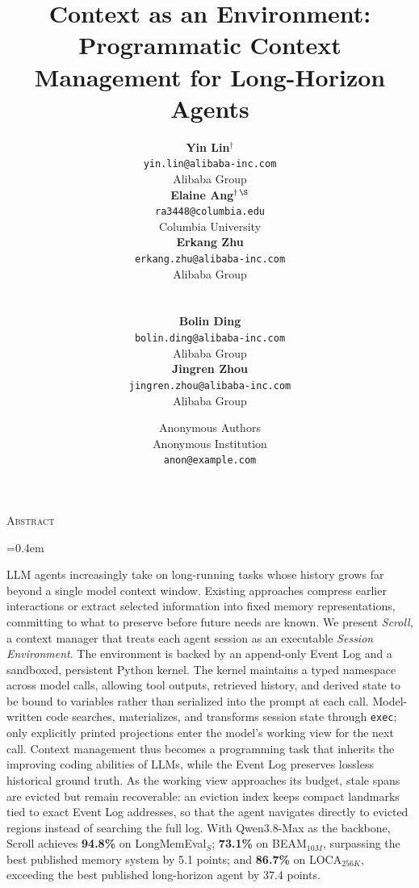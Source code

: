 \documentclass[11pt]{article}
\title{
    Context as an Environment:\\
    Programmatic Context Management for Long-Horizon Agents
}
\author{%
      \begin{tabular}[t]{c}
        \textbf{Yin Lin}$^{\dagger}$\\
        {\footnotesize\texttt{yin.lin@alibaba-inc.com}}\\
        {\small Alibaba Group}
      \end{tabular}\hspace{1.2em}
      \begin{tabular}[t]{c}
        \textbf{Elaine Ang}$^{\dagger\,\S}$\\
        {\footnotesize\texttt{ra3448@columbia.edu}}\\
        {\small Columbia University}
      \end{tabular}\hspace{1.2em}
      \begin{tabular}[t]{c}
        \textbf{Erkang Zhu}\\
        {\footnotesize\texttt{erkang.zhu@alibaba-inc.com}}\\
        {\small Alibaba Group}
      \end{tabular}\\[1.2em]
      \begin{tabular}[t]{c}
        \textbf{Bolin Ding}\\
        {\footnotesize\texttt{bolin.ding@alibaba-inc.com}}\\
        {\small Alibaba Group}
      \end{tabular}\hspace{3em}
      \begin{tabular}[t]{c}
        \textbf{Jingren Zhou}\\
        {\footnotesize\texttt{jingren.zhou@alibaba-inc.com}}\\
        {\small Alibaba Group}
      \end{tabular}%
    }
\date{}
\author{Anonymous Authors \\
    Anonymous Institution \\
    \texttt{anon@example.com}}
\makeatletter
\renewcommand{\maketitle}{%
      \thispagestyle{fancy}%
      \begin{center}
        \vspace*{0.3em}
        {\LARGE\bfseries \@title\par}
        \vspace{1.2em}
        \@author\par
      \end{center}
      \vspace{0.8em}
    }
\renewenvironment{abstract}{%
      \begin{center}{\large\scshape Abstract}\end{center}%
      \vspace{-0.3em}%
      \begin{list}{}{\leftmargin=0.4in \rightmargin=0.4in
                     \listparindent=0pt \topsep=0pt \parsep=0.4em}\item\relax
    }{\end{list}\vspace{0.5em}}
\makeatother
\begin{document}
 
\maketitle
 
\ifarxiv
    \renewcommand{\thefootnote}{}
    \renewcommand{\thefootnote}{\arabic{footnote}}
    \setcounter{footnote}{0}
\fi
 
\begin{abstract}
LLM agents increasingly take on long-running tasks whose history grows far beyond a single model context window. Existing approaches compress earlier interactions or extract selected information into fixed memory representations, committing to what to preserve before future needs are known.
We present \emph{Scroll}, a context manager that treats each agent session as an executable \emph{Session Environment}. 
The environment is backed by an append-only Event Log and a sandboxed, persistent Python kernel. The kernel maintains a typed namespace across model calls, allowing tool outputs, retrieved history, and derived state to be bound to variables rather than serialized into the prompt at each call. Model-written code searches, materializes, and transforms session state through \texttt{exec}; only explicitly printed projections enter the model's working view for the next call.
Context management thus becomes a programming task that inherits the improving coding abilities of LLMs, while the Event Log preserves lossless historical ground truth.
As the working view approaches its budget, stale spans are evicted but remain recoverable: an eviction index keeps compact landmarks tied to exact Event Log addresses, so that the agent navigates directly to evicted regions instead of searching the full log.
With Qwen3.8-Max as the backbone, Scroll achieves \textbf{94.8\%} on LongMemEval$_S$; \textbf{73.1\%} on BEAM$_{10M}$, surpassing the best published memory system by 5.1 points; and \textbf{86.7\%} on LOCA$_{256K}$, exceeding the best published long-horizon agent by 37.4 points.
\end{abstract}








\ifarxiv
    
\else
    
\fi


\clearpage
\appendix

\end{document}
